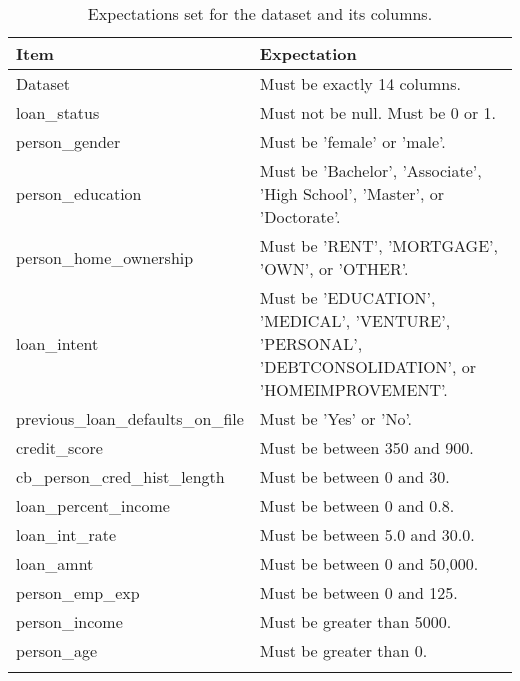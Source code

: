 \begin{longtable}{ | p{} | p{} |}
    \hline
    \cellcolor{blue!25}Item & \cellcolor{blue!25}Expectation\\
    \hline
    Dataset & Must be exactly 14 columns. \\
    \hline
    loan\_status & Must not be null. \newline Must be 0 or 1. \\
    \hline 
    person\_gender & Must be 'female' or 'male'. \\
    \hline 
    person\_education & Must be 'Bachelor', 'Associate', 'High School', 'Master', or 'Doctorate'. \\
    \hline
    person\_home\_ownership & Must be 'RENT', 'MORTGAGE', 'OWN', or 'OTHER'.\\
    \hline 
    loan\_intent & Must be 'EDUCATION', 'MEDICAL', 'VENTURE', 'PERSONAL', 'DEBTCONSOLIDATION', or 'HOMEIMPROVEMENT'.\\
    \hline 
    previous\_loan\_defaults\_on\_file & Must be 'Yes' or 'No'. \\
    \hline
    credit\_score & Must be between 350 and 900. \\
    \hline
    cb\_person\_cred\_hist\_length & Must be between 0 and 30. \\
    \hline
    loan\_percent\_income & Must be between 0 and 0.8. \\
    \hline
    loan\_int\_rate & Must be between 5.0 and 30.0. \\
    \hline
    loan\_amnt & Must be between 0 and 50,000. \\
    \hline 
    person\_emp\_exp & Must be between 0 and 125. \\
    \hline 
    person\_income & Must be greater than 5000. \\
    \hline 
    person\_age & Must be greater than 0. \\
    \hline
\caption{Expectations set for the dataset and its columns.}\label{tab:Expectations}
\end{longtable}

